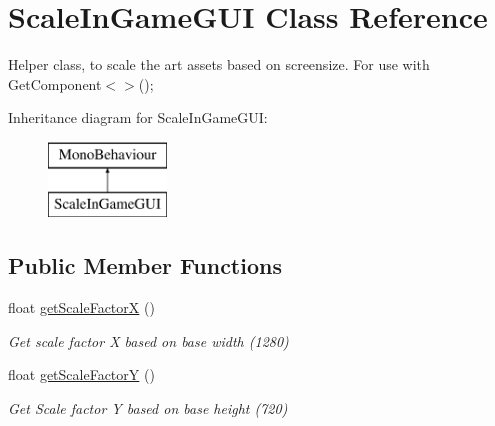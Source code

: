 \hypertarget{class_scale_in_game_g_u_i}{\section{Scale\+In\+Game\+G\+U\+I Class Reference}
\label{class_scale_in_game_g_u_i}
}


Helper class, to scale the art assets based on screensize. For use with Get\+Component$<$$>$();  


Inheritance diagram for Scale\+In\+Game\+G\+U\+I\+:\begin{figure}[H]
\begin{center}
\leavevmode
\includegraphics[height=2.000000cm]{class_scale_in_game_g_u_i}
\end{center}
\end{figure}
\subsection*{Public Member Functions}
\begin{DoxyCompactItemize}
\item 
float \hyperlink{class_scale_in_game_g_u_i_ae3942b3cc59a81c4a313d9a95fc51ca8}{get\+Scale\+Factor\+X} ()
\begin{DoxyCompactList}\small\item\em Get scale factor X based on base width (1280) \end{DoxyCompactList}\item 
float \hyperlink{class_scale_in_game_g_u_i_a92ffdb5483a4584e153c7a3790a48f00}{get\+Scale\+Factor\+Y} ()
\begin{DoxyCompactList}\small\item\em Get Scale factor Y based on base height (720) \end{DoxyCompactList}\end{DoxyCompactItemize}
